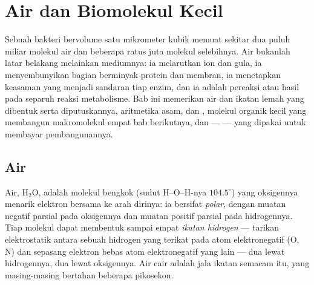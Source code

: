 \chapter{Air dan Biomolekul Kecil}\label{ch:b1:water-small-molecules}

Sebuah bakteri bervolume satu mikrometer kubik memuat sekitar dua puluh
miliar molekul air dan beberapa ratus juta molekul selebihnya. Air
bukanlah latar belakang  melainkan mediumnya: ia melarutkan ion dan
gula, ia menyembunyikan bagian berminyak protein dan membran, ia
menetapkan keasaman yang menjadi sandaran tiap enzim, dan ia adalah
pereaksi atau hasil pada separuh reaksi metabolisme. Bab ini memerikan
air dan ikatan lemah yang dibentuk serta diputuskannya, aritmetika asam,
 dan , molekul organik kecil yang membangun makromolekul
empat bab berikutnya, dan  ---  --- yang dipakai 
untuk membayar pembangunannya.

\section{Air}

\begin{definition}\label{def:b1:water-small-molecules:water}
Air, $\mathrm{H_2O}$, adalah molekul bengkok (sudut H--O--H-nya
$104.5^\circ$) yang oksigennya menarik elektron bersama ke arah
dirinya: ia bersifat \emph{polar}, dengan muatan
negatif parsial pada oksigennya dan muatan positif parsial pada
hidrogennya. Tiap molekul dapat membentuk sampai empat \emph{ikatan
hidrogen} --- tarikan elektrostatik antara sebuah
hidrogen yang terikat pada atom elektronegatif (O, N) dan sepasang
elektron bebas atom elektronegatif yang lain --- dua lewat hidrogennya,
dua lewat oksigennya. Air cair adalah jala ikatan semacam itu, yang
masing-masing bertahan beberapa pikosekon.
\end{definition}

